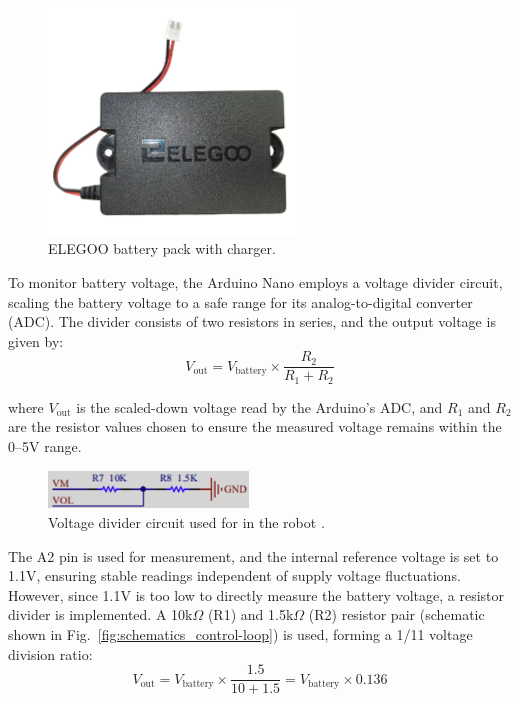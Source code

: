 \begin{figure}[h]
	\centering
	\includegraphics[height=6cm]{assets/Battery.png}
	\caption{ELEGOO battery pack with charger.}
	\label{fig:battery}
\end{figure}

To monitor battery voltage, the Arduino Nano employs a voltage divider circuit, scaling the battery voltage to a safe range for its analog-to-digital converter (ADC). The divider consists of two resistors in series, and the output voltage is given by:  
\begin{equation}  
	V_{\text{out}} = V_{\text{battery}} \times \frac{R_2}{R_1 + R_2}  
\end{equation}  

where \( V_{\text{out}} \) is the scaled-down voltage read by the Arduino’s ADC, and \( R_1 \) and \( R_2 \) are the resistor values chosen to ensure the measured voltage remains within the 0–5V range.  

\begin{figure}[H]  
	\centering  
	\includegraphics[height=1cm]{assets/voltage-divider.png}  
	\caption{Voltage divider circuit used for in the robot \cite{tumbller}.}  
	\label{fig:voltage-divider}  
\end{figure}

The A2 pin is used for measurement, and the internal reference voltage is set to 1.1V, ensuring stable readings independent of supply voltage fluctuations. However, since 1.1V is too low to directly measure the battery voltage, a resistor divider is implemented. A 10k\(\Omega\) (R1) and 1.5k\(\Omega\) (R2) resistor pair (schematic shown in Fig.~\ref{fig:schematics_control-loop}) is used, forming a 1/11 voltage division ratio:
\begin{equation}  
	V_{\text{out}} = V_{\text{battery}} \times \frac{1.5}{10 + 1.5} = V_{\text{battery}} \times 0.136  
\end{equation}  

